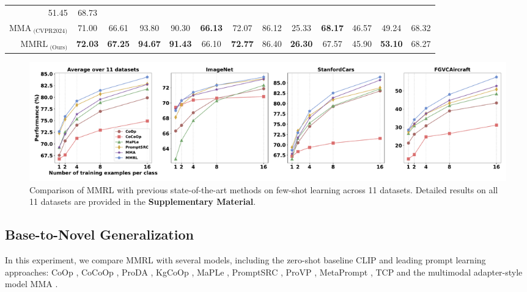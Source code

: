 \begin{table}[t]
{\begin{tabular}{@{}rc|ccccccccccc@{}}
      51.45 &
      68.73 \\
    $\text{MMA}_{\text{ (CVPR2024)}}$ &
      71.00 &
      66.61 &
      93.80 &
      90.30 &
      \textbf{66.13} &
      72.07 &
      86.12 &
      25.33 &
      \textbf{68.17} &
      46.57 &
      49.24 &
      68.32 \\ \midrule
    $\text{MMRL}_{\text{ (Ours)}}$ &
      \textbf{72.03} &
      \textbf{67.25} &
      \textbf{94.67} &
      \textbf{91.43} &
      66.10 &
      \textbf{72.77} &
      86.40 &
      \textbf{26.30} &
      67.57 &
      45.90 &
      \textbf{53.10} &
      68.27 \\ \bottomrule
    \end{tabular}
    }
\vspace{-0.3cm}
\end{table}




\begin{figure}[t]
\centering
\setlength{\belowcaptionskip}{-0.39cm}  
  \includegraphics[width=0.9\linewidth]{fig/few_shot.pdf}
  \vspace{-0.3cm}
  \caption{Comparison of MMRL with previous state-of-the-art methods on few-shot learning across 11 datasets. Detailed results on all 11 datasets are provided in the \textbf{Supplementary Material}.}
  \label{few_shot_figure}
\end{figure}



\subsection{Base-to-Novel Generalization}

In this experiment, we compare MMRL with several models, including the zero-shot baseline CLIP and leading prompt learning approaches: CoOp \cite{coop}, CoCoOp \cite{cocoop}, ProDA \cite{proda}, KgCoOp \cite{kgcoop}, MaPLe \cite{maple}, PromptSRC \cite{promptsrc}, ProVP \cite{provp}, MetaPrompt \cite{metaprompt}, TCP \cite{tcp} and the multimodal adapter-style model MMA \cite{mma}. 

